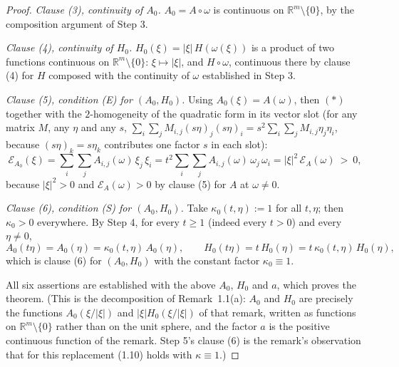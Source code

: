 \begin{proof}
\emph{Clause (3), continuity of $A_0$.} $A_0=A\circ\omega$ is continuous on
$\mathbb R^{m}\setminus\{0\}$, by the composition argument of Step 3.

\emph{Clause (4), continuity of $H_0$.} $H_0(\xi)=|\xi|\,H(\omega(\xi))$ is a product of two
functions continuous on $\mathbb R^{m}\setminus\{0\}$: $\xi\mapsto|\xi|$, and
$H\circ\omega$, continuous there by clause (4) for $H$ composed with the continuity of
$\omega$ established in Step 3.

\emph{Clause (5), condition (E) for $(A_0,H_0)$.} Using $A_0(\xi)=A(\omega)$, then $(\ast)$ together with the
$2$-homogeneity of the quadratic form in its vector slot (for any matrix $M$, any $\eta$ and
any $s$, $\sum_i\sum_j M_{i,j}(s\eta)_j(s\eta)_i=s^{2}\sum_i\sum_j M_{i,j}\eta_j\eta_i$,
because $(s\eta)_k=s\eta_k$ contributes one factor $s$ in each slot):
\[
 \mathcal E_{A_0}(\xi)=\sum_{i}\sum_{j}A_{i,j}(\omega)\,\xi_j\,\xi_i
  =t^{2}\sum_{i}\sum_{j}A_{i,j}(\omega)\,\omega_j\,\omega_i
  =|\xi|^{2}\,\mathcal E_A(\omega)\ >\ 0,
\]
because $|\xi|^{2}>0$ and $\mathcal E_A(\omega)>0$ by clause (5) for $A$ at
$\omega\ne0$.

\emph{Clause (6), condition (S) for $(A_0,H_0)$.} Take $\kappa_0(t,\eta):=1$ for all
$t,\eta$; then $\kappa_0>0$
everywhere. By Step 4, for every $t\ge1$ (indeed every $t>0$) and every $\eta\ne0$,
\[
 A_0(t\eta)=A_0(\eta)=\kappa_0(t,\eta)\,A_0(\eta),
 \qquad
 H_0(t\eta)=t\,H_0(\eta)=t\,\kappa_0(t,\eta)\,H_0(\eta),
\]
which is clause (6) for $(A_0,H_0)$ with the constant factor $\kappa_0\equiv1$.

\medskip
All six assertions are established with the above $A_0$, $H_0$ and $a$, which proves the
theorem. (This is the decomposition of Remark~1.1(a): $A_0$ and $H_0$ are precisely the
functions $A_0(\xi/|\xi|)$ and $|\xi|H_0(\xi/|\xi|)$ of that remark, written as functions on
$\mathbb R^{m}\setminus\{0\}$ rather than on the unit sphere, and the factor $a$ is the
positive continuous function of the remark. Step 5's clause (6) is the remark's
observation that for this replacement (1.10) holds with $\kappa\equiv1$.)
\end{proof}
